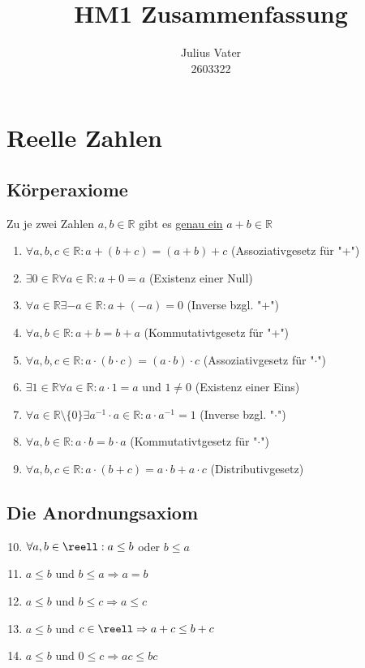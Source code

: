 \documentclass{kit}
\author{Julius Vater\\ 2603322}
\title{HM1 Zusammenfassung}
\begin{document}
\maketitle
\pagebreak
\tableofcontents
\pagebreak
{}
\section{Reelle Zahlen}
  \subsection{Körperaxiome}
    Zu je zwei Zahlen $a,b\in\mathbb{R}$ gibt es \underline{genau ein} $a+b\in\mathbb{R}$
    \begin{enumerate}
      \item $\forall a,b,c\in\mathbb{R}:a+(b+c)=(a+b)+c$ (Assoziativgesetz für "+")
      \item $\exists0\in\mathbb{R}\forall a\in\mathbb{R}:a+0=a$ (Existenz einer Null)
      \item $\forall a\in\mathbb{R}\exists-a\in\mathbb{R}:a+(-a)=0$ (Inverse bzgl. "+")
      \item $\forall a,b\in\mathbb{R}:a+b=b+a$ (Kommutativtgesetz für "+")
      \item $\forall a,b,c\in\mathbb{R}:a\cdot(b\cdot c)=(a\cdot b)\cdot c$ (Assoziativgesetz für "$\cdot$")
      \item $\exists1\in\mathbb{R}\forall a\in\mathbb{R}:a\cdot1=a$ und $1\neq0$ (Existenz einer Eins)
      \item $\forall a\in\mathbb{R}\setminus\{0\}\exists a^{-1}\cdot a\in\mathbb{R}:a\cdot a^{-1}=1$ (Inverse bzgl. "$\cdot$")
      \item $\forall a,b\in\mathbb{R}:a\cdot b=b\cdot a$ (Kommutativtgesetz für "$\cdot$")
      \item $\forall a,b,c\in\mathbb{R}:a\cdot(b+c)=a\cdot b+a\cdot c$ (Distributivgesetz)
    \end{enumerate}
  \subsection{Die Anordnungsaxiom}
    \begin{enumerate}
      \setcounter{enumi}{9}
      \item $\forall a,b\in\reell:a\le b$ oder $b\le a$
      \item $a\le b$ und $b\le a\Rightarrow a=b$
      \item $a\le b$ und $b\le c\Rightarrow a\le c$
      \item $a\le b$ und $c\in\reell\Rightarrow a+c\le b+c$
      \item $a\le b$ und $0\le c\Rightarrow ac\le bc$
    \end{enumerate}
\end{document}

